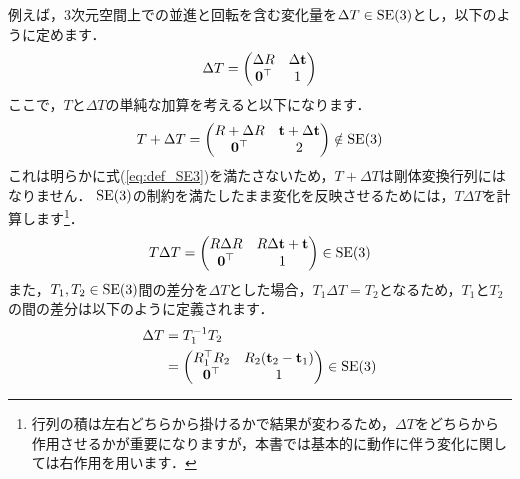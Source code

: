 例えば，3次元空間上での並進と回転を含む変化量を$\Delta T \in {\rm SE}(3)$とし，以下のように定めます．
%
\begin{align}
  \Delta T
%
  = \left( \begin{matrix}
      \Delta R       & \Delta {\bf t} \\
      {\bf 0}^{\top} & 1
    \end{matrix} \right)
\end{align}
%
ここで，$T$と$\Delta T$の単純な加算を考えると以下になります．
%
\begin{align}
  T + \Delta T
%
  = \left( \begin{matrix}
      R + \Delta R       & {\bf t} + \Delta {\bf t} \\
      {\bf 0}^{\top}     & 2
    \end{matrix} \right) \notin {\rm SE}(3)
\end{align}
%
これは明らかに式(\ref{eq:def_SE3})を満たさないため，$T + \Delta T$は剛体変換行列にはなりません．
${\rm SE}(3)$の制約を満たしたまま変化を反映させるためには，$T \Delta T$を計算します\footnote{行列の積は左右どちらから掛けるかで結果が変わるため，$\Delta T$をどちらから作用させるかが重要になりますが，本書では基本的に動作に伴う変化に関しては右作用を用います．}．
%
\begin{align}
  T \Delta T
%
  = \left( \begin{matrix}
      R \Delta R     & R \Delta {\bf t} + {\bf t} \\
      {\bf 0}^{\top} & 1
    \end{matrix} \right) \in {\rm SE}(3)
  \label{eq:se3_add}
\end{align}
%
また，$T_{1}, T_{2} \in {\rm SE}(3)$間の差分を$\Delta T$とした場合，$T_{1} \Delta T = T_{2}$となるため，$T_{1}$と$T_{2}$の間の差分は以下のように定義されます．
%
\begin{align}
  \begin{split}
    \Delta T
%
    & = T_{1}^{-1} T_{2} \\
%
    & = \left( \begin{matrix}
          R_{1}^{\top} R_{2} & R_{2} ({\bf t}_{2} - {\bf t}_{1}) \\
          {\bf 0}^{\top}     & 1
        \end{matrix} \right) \in {\rm SE}(3)
  \end{split}
  \label{eq:se3_diff}
\end{align}

